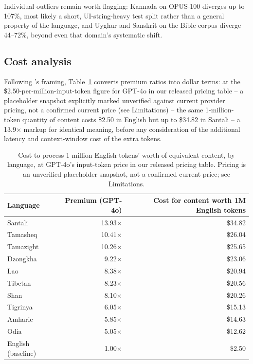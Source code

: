 \documentclass[11pt]{article}
\begin{document}
Individual outliers remain worth flagging: Kannada on OPUS-100 diverges up
to 107\%, most likely a short, UI-string-heavy test split rather than a
general property of the language, and Uyghur and Sanskrit on the Bible
corpus diverge 44--72\%, beyond even that domain's systematic shift.

\subsection{Cost analysis}
\label{sec:cost}

Following \citet{ahia2023}'s framing, Table~\ref{tab:cost} converts premium
ratios into dollar terms: at the \$2.50-per-million-input-token figure for
GPT-4o in our released pricing table -- a placeholder snapshot explicitly
marked unverified against current provider pricing, not a confirmed
current price (see Limitations) -- the same 1-million-token quantity of
content costs \$2.50 in English but up to \$34.82 in Santali -- a
13.9$\times$ markup for identical meaning, before any consideration of the
additional latency and context-window cost of the extra tokens.

\begin{table}[htbp]
\centering
\small
\begin{tabular}{lrr}
\toprule
Language & Premium (GPT-4o) & Cost for content worth 1M English tokens \\
\midrule
Santali    & 13.93$\times$ & \$34.82 \\
Tamasheq   & 10.41$\times$ & \$26.04 \\
Tamazight  & 10.26$\times$ & \$25.65 \\
Dzongkha   & 9.22$\times$  & \$23.06 \\
Lao        & 8.38$\times$  & \$20.94 \\
Tibetan    & 8.23$\times$  & \$20.56 \\
Shan       & 8.10$\times$  & \$20.26 \\
Tigrinya   & 6.05$\times$  & \$15.13 \\
Amharic    & 5.85$\times$  & \$14.63 \\
Odia       & 5.05$\times$  & \$12.62 \\
\midrule
English (baseline) & 1.00$\times$ & \$2.50 \\
\bottomrule
\end{tabular}
\caption{Cost to process 1 million English-tokens' worth of equivalent
content, by language, at GPT-4o's input-token price in our released
pricing table. Pricing is an unverified placeholder snapshot, not a
confirmed current price; see Limitations.}
\label{tab:cost}
\end{table}
\end{document}
